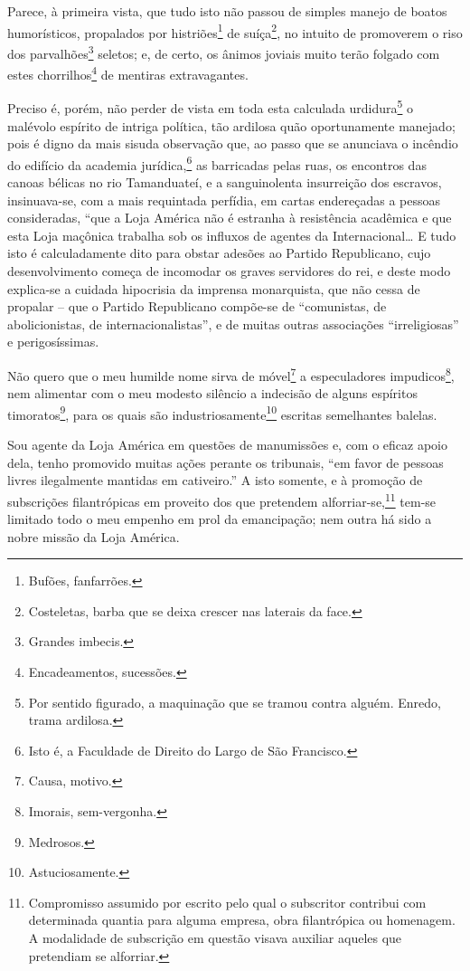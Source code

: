 {Parece, à primeira vista, que tudo isto não passou de simples manejo de
boatos humorísticos, propalados por histriões\footnote{ Bufões,
  fanfarrões.} de suíça\footnote{ Costeletas, barba que se deixa
  crescer nas laterais da face.}, no intuito de promoverem o riso dos
parvalhões\footnote{ Grandes imbecis.} seletos; e, de certo, os ânimos
joviais muito terão folgado com estes chorrilhos\footnote{
  Encadeamentos, sucessões.} de mentiras extravagantes.

Preciso é, porém, não perder de vista em toda esta calculada
urdidura\footnote{ Por sentido figurado, a maquinação que se tramou
  contra alguém. Enredo, trama ardilosa.} o malévolo espírito de intriga
política, tão ardilosa quão oportunamente manejado; pois é digno da mais
sisuda observação que, ao passo que se anunciava o incêndio do edifício
da academia jurídica,\footnote{ Isto é, a Faculdade de Direito do Largo
  de São Francisco.} as barricadas pelas ruas, os encontros das canoas
bélicas no rio Tamanduateí, e a sanguinolenta insurreição dos escravos,
insinuava-se, com a mais requintada perfídia, em cartas endereçadas a
pessoas consideradas, ``que a Loja América não é estranha à resistência
acadêmica e que esta Loja maçônica trabalha sob os influxos de agentes
da Internacional\ldots{} E tudo isto é calculadamente dito para obstar
adesões ao Partido Republicano, cujo desenvolvimento começa de incomodar
os graves servidores do rei, e deste modo explica-se a cuidada
hipocrisia da imprensa monarquista, que não cessa de propalar -- que o
Partido Republicano compõe-se de ``comunistas, de abolicionistas, de
internacionalistas'', e de muitas outras associações ``irreligiosas'' e
perigosíssimas.

Não quero que o meu humilde nome sirva de móvel\footnote{ Causa,
  motivo.} a especuladores impudicos\footnote{ Imorais, sem-vergonha.},
nem alimentar com o meu modesto silêncio a indecisão de alguns espíritos
timoratos\footnote{ Medrosos.}, para os quais são
industriosamente\footnote{ Astuciosamente.} escritas semelhantes
balelas.

Sou agente da Loja América em questões de manumissões e, com o eficaz
apoio dela, tenho promovido muitas ações perante os tribunais, ``em favor
de pessoas livres ilegalmente mantidas em cativeiro.'' A isto somente, e
à promoção de subscrições filantrópicas em proveito dos que pretendem
alforriar-se,\footnote{ Compromisso assumido por escrito pelo qual o
  subscritor contribui com determinada quantia para alguma empresa, obra
  filantrópica ou homenagem. A modalidade de subscrição em questão
  visava auxiliar aqueles que pretendiam se alforriar.} tem-se limitado
todo o meu empenho em prol da emancipação; nem outra há sido a nobre
missão da Loja América.

}
